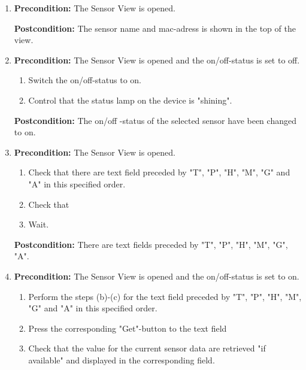 \documentclass[a4paper]{article}
\newlength{\testlabellength}
\newenvironment{testlist}{\begin{enumerate}[label=\bfseries Instruction \thesubsection.\arabic* , labelindent=0pt, labelwidth=\testlabellength , leftmargin=2cm]}{\end{enumerate}}
\begin{document}
\begin{appendices}
\begin{testlist}

 \item \vspace{5mm} \textbf{Precondition:} The Sensor View is opened.
    		
    			
    			
    			\textbf{Postcondition:} The sensor name and mac-adress is shown in the top of the view.
 
  \item \vspace{5mm} \textbf{Precondition:} The Sensor View is opened and the on/off-status is set to off.
    			\begin{enumerate}
    				\item Switch the on/off-status to on.  
	    		    \item Control that the status lamp on the device is "shining".
    			\end{enumerate}
    			\textbf{Postcondition:} The on/off -status of the selected sensor have been changed to on.

 \item \vspace{5mm} \textbf{Precondition:} The Sensor View is opened. 
    			\begin{enumerate}
    				\item Check that there are text field preceded by "T", "P", "H", "M", "G" and "A" in this specified order. 
    				\item Check that 
	    			\item Wait.
    			
    			\end{enumerate}
    			\textbf{Postcondition:} There are text fields preceded by "T", "P", "H", "M", "G", "A".

 \item \vspace{5mm} \textbf{Precondition:} The Sensor View is opened and the on/off-status is set to on.
    			\begin{enumerate}
    				\item Perform the steps (b)-(c) for the text field preceded by "T", "P", "H", "M", "G" and "A" in this specified order.
                    \item Press the corresponding "Get"-button to the text field
    				\item Check that the value for the current sensor data are retrieved "if available" and displayed in the corresponding field.
	    			

\end{enumerate}
\end{testlist}
\end{appendices}
\end{document}
